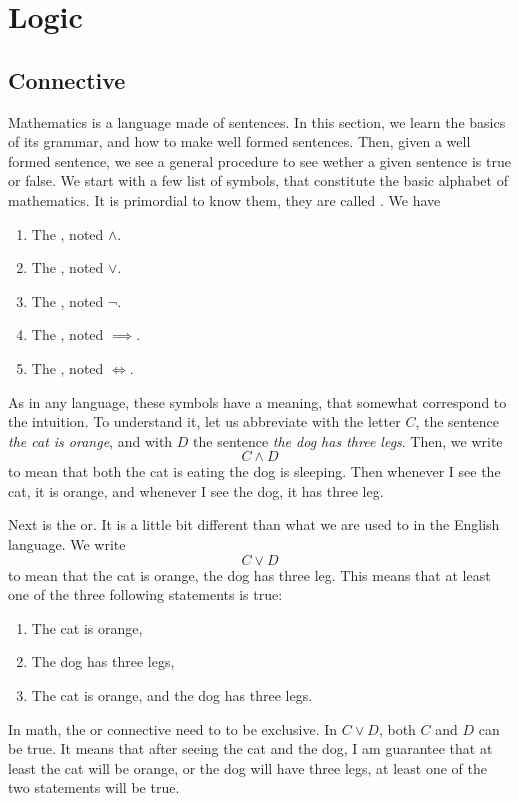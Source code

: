 \section{Logic}

\subsection{Connective}

Mathematics is a language made of sentences. In this section, we learn the basics of its grammar, and how to make well formed sentences. Then, given a well formed sentence, we see a general procedure to see wether a given sentence is true or false. We start with a few list of symbols, that constitute the basic alphabet of mathematics. It is primordial to know them, they are called . We have

\begin{enumerate}
    \item The , noted \( \land \). 
    \item The , noted \( \lor \). 
    \item The , noted \( \neg \). 
    \item The , noted \( \implies \). 
    \item The , noted \( \iff \). 
\end{enumerate}

As in any language, these symbols have a meaning, that somewhat correspond to the intuition. To understand it, let us abbreviate with the letter \( C \), the sentence \textit{the cat is orange}, and with \( D \) the sentence \textit{the dog has three legs}. Then, we write
\begin{equation*}
    C \land D
\end{equation*}
to mean that both the cat is eating  the dog is sleeping. Then whenever I see the cat, it is orange, and whenever I see the dog, it has three leg. 

Next is the or. It is a little bit different than what we are used to in the English language. We write
\begin{equation*}
    C \lor D
\end{equation*}
to mean that the cat is orange,  the dog has three leg. This means that at least one of the three following statements is true:
\begin{enumerate}
    \item The cat is orange,
    \item The dog has three legs,
    \item The cat is orange, and the dog has three legs.
\end{enumerate}
In math, the or connective need to to be exclusive. In \( C \lor D \), both \( C \) and \( D \) can be true. It means that after seeing the cat and the dog, I am guarantee that at least the cat will be orange, or the dog will have three legs, at least one of the two statements will be true. 


